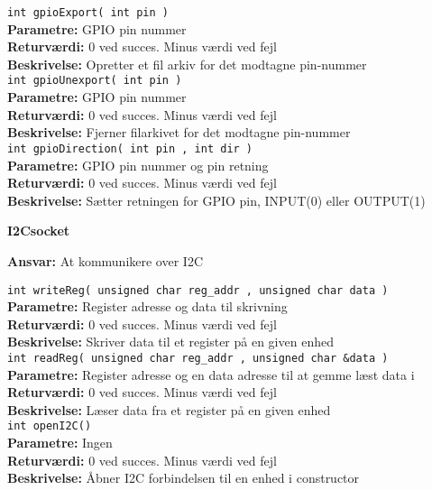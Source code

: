 \verb+int gpioExport( int pin ) +\\
\textbf{Parametre:}   GPIO pin nummer \\
\textbf{Returværdi:}  0 ved succes. Minus værdi ved fejl \\
\textbf{Beskrivelse:} Opretter et fil arkiv for det modtagne pin-nummer \\

\verb+int gpioUnexport( int pin ) +\\
\textbf{Parametre:}   GPIO pin nummer \\
\textbf{Returværdi:}  0 ved succes. Minus værdi ved fejl \\
\textbf{Beskrivelse:} Fjerner filarkivet for det modtagne pin-nummer \\

\verb+int gpioDirection( int pin , int dir ) +\\
\textbf{Parametre:}   GPIO pin nummer og pin retning \\
\textbf{Returværdi:}  0 ved succes. Minus værdi ved fejl \\
\textbf{Beskrivelse:} Sætter retningen for GPIO pin, INPUT(0) eller OUTPUT(1) \\

{\centering
\textbf{I2Csocket}\par
}
\textbf{Ansvar:} At kommunikere over I2C \

\verb+int writeReg( unsigned char reg_addr , unsigned char data ) +\\
\textbf{Parametre:}   Register adresse og data til skrivning \\
\textbf{Returværdi:}  0 ved succes. Minus værdi ved fejl \\
\textbf{Beskrivelse:} Skriver data til et register på en given enhed \\

\verb+int readReg( unsigned char reg_addr , unsigned char &data ) +\\
\textbf{Parametre:}   Register adresse og en data adresse til at gemme læst data i \\
\textbf{Returværdi:}  0 ved succes. Minus værdi ved fejl \\
\textbf{Beskrivelse:} Læser data fra et register på en given enhed \\

\verb+int openI2C() +\\
\textbf{Parametre:}   Ingen \\
\textbf{Returværdi:}  0 ved succes. Minus værdi ved fejl \\
\textbf{Beskrivelse:} Åbner I2C forbindelsen til en enhed i constructor \\

